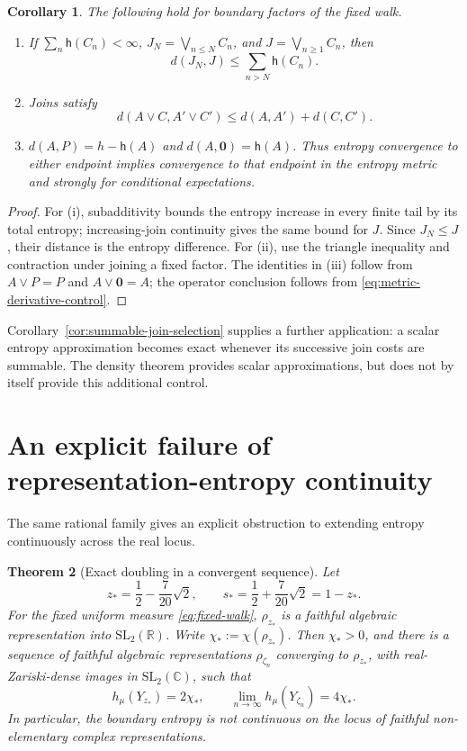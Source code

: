 \documentclass[11pt,letterpaper]{amsart}
\newtheorem{theorem}{Theorem}[section]
\newtheorem{corollary}[theorem]{Corollary}
\theoremstyle{definition}
\theoremstyle{remark}
\numberwithin{equation}{section}
\begin{document}
\begin{corollary}\label{cor:metric-applications}
The following hold for boundary factors of the fixed walk.
\begin{enumerate}
\item If $\sum_n\mathsf h(C_n)<\infty$, $J_N=\bigvee_{n\le N}C_n$,
and $J=\bigvee_{n\ge1}C_n$, then
\[
 d(J_N,J)\le\sum_{n>N}\mathsf h(C_n).
\]
\item Joins satisfy
\[
 d(A\vee C,A'\vee C')\le d(A,A')+d(C,C').
\]
\item $d(A,P)=h-\mathsf h(A)$ and $d(A,\mathbf0)=\mathsf h(A)$.
Thus entropy convergence to either endpoint implies convergence to that
endpoint in the entropy metric and strongly for conditional expectations.
\end{enumerate}
\end{corollary}
\begin{proof}
For (i), subadditivity bounds the entropy increase in every finite tail
by its total entropy; increasing-join continuity gives the same bound
for $J$. Since $J_N\le J$, their distance is the entropy difference.
For (ii), use the triangle inequality and contraction under joining a
fixed factor. The identities in (iii) follow from $A\vee P=P$ and
$A\vee\mathbf0=A$; the operator conclusion follows from
\eqref{eq:metric-derivative-control}.
\end{proof}

Corollary~\ref{cor:summable-join-selection} supplies a further application:
a scalar entropy approximation becomes exact whenever its successive
join costs are summable. The density theorem provides scalar
approximations, but does not by itself provide this additional control.

\section{An explicit failure of representation-entropy continuity}\label{sec:jump}

The same rational family gives an explicit obstruction to extending
entropy continuously across the real locus.

\begin{theorem}[Exact doubling in a convergent sequence]\label{thm:explicit-jump}
Let
\[
 z_* =\frac12-\frac7{20}\sqrt2,\qquad
 s_* =\frac12+\frac7{20}\sqrt2=1-z_*.
\]
For the fixed uniform measure \eqref{eq:fixed-walk}, $\rho_{z_*}$ is a faithful
algebraic representation into $\mathrm{SL}_2(\mathbb R)$. Write
$\chi_*:=\chi(\rho_{z_*})$. Then $\chi_*>0$, and there is a sequence
of faithful algebraic representations $\rho_{\zeta_n}$ converging to
$\rho_{z_*}$, with real-Zariski-dense images in
$\mathrm{SL}_2(\mathbb C)$, such that
\[
 h_\mu(Y_{z_*})=2\chi_*,\qquad
 \lim_{n\to\infty}h_\mu(Y_{\zeta_n})=4\chi_*.
\]
In particular, the boundary entropy is not continuous on the locus of
faithful non-elementary complex representations.
\end{theorem}
\end{document}
